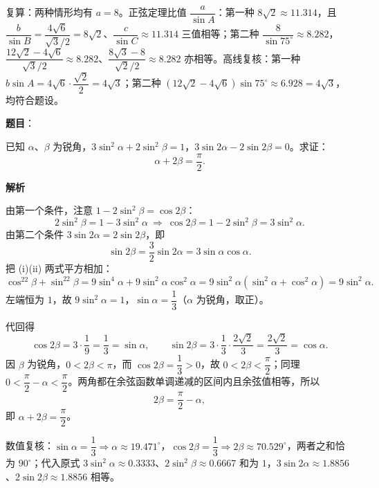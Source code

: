 \begin{answer}
复算：两种情形均有 $a=8$。正弦定理比值 $\dfrac{a}{\sin A}$：第一种 $8\sqrt2\approx11.314$，且 $\dfrac{b}{\sin B}=\dfrac{4\sqrt6}{\sqrt3/2}=8\sqrt2$、$\dfrac{c}{\sin C}\approx11.314$ 三值相等；第二种 $\dfrac{8}{\sin75^\circ}\approx8.282$，$\dfrac{12\sqrt2-4\sqrt6}{\sqrt3/2}\approx8.282$、$\dfrac{8\sqrt3-8}{\sqrt2/2}\approx8.282$ 亦相等。高线复核：第一种 $b\sin A=4\sqrt6\cdot\dfrac{\sqrt2}{2}=4\sqrt3$；第二种 $(12\sqrt2-4\sqrt6)\sin75^\circ\approx6.928=4\sqrt3$，均符合题设。


\end{answer}
\begin{answer}

\textbf{题目}：

已知 $\alpha$、$\beta$ 为锐角，$3\sin^2\alpha+2\sin^2\beta=1$，$3\sin 2\alpha-2\sin 2\beta=0$。求证：
\nopagebreak[4]
\[
\alpha+2\beta=\frac{\pi}{2}.
\]

\textbf{解析}

由第一个条件，注意 $1-2\sin^2\beta=\cos2\beta$：
\nopagebreak[4]
\[
2\sin^2\beta=1-3\sin^2\alpha\ \Longrightarrow\ \cos2\beta=1-2\sin^2\beta=3\sin^2\alpha. \tag{i}
\]
由第二个条件 $3\sin2\alpha=2\sin2\beta$，即
\nopagebreak[4]
\[
\sin2\beta=\frac32\sin2\alpha=3\sin\alpha\cos\alpha. \tag{ii}
\]
把 (i)(ii) 两式平方相加：
\nopagebreak[4]
\[
\cos^22\beta+\sin^22\beta=9\sin^4\alpha+9\sin^2\alpha\cos^2\alpha=9\sin^2\alpha(\sin^2\alpha+\cos^2\alpha)=9\sin^2\alpha.
\]
左端恒为 $1$，故 $9\sin^2\alpha=1$，$\sin\alpha=\dfrac13$（$\alpha$ 为锐角，取正）。

代回得
\nopagebreak[4]
\[
\cos2\beta=3\cdot\frac19=\frac13=\sin\alpha,\qquad
\sin2\beta=3\cdot\frac13\cdot\frac{2\sqrt2}{3}=\frac{2\sqrt2}{3}=\cos\alpha.
\]
因 $\beta$ 为锐角，$0<2\beta<\pi$，而 $\cos2\beta=\dfrac13>0$，故 $0<2\beta<\dfrac\pi2$；同理 $0<\dfrac\pi2-\alpha<\dfrac\pi2$。两角都在余弦函数单调递减的区间内且余弦值相等，所以
\nopagebreak[4]
\[
2\beta=\frac\pi2-\alpha,
\]
即 $\alpha+2\beta=\dfrac\pi2$。

数值复核：$\sin\alpha=\dfrac13\Rightarrow\alpha\approx19.471^\circ$，$\cos2\beta=\dfrac13\Rightarrow2\beta\approx70.529^\circ$，两者之和恰为 $90^\circ$；代入原式 $3\sin^2\alpha\approx0.3333$、$2\sin^2\beta\approx0.6667$ 和为 $1$，$3\sin2\alpha\approx1.8856$、$2\sin2\beta\approx1.8856$ 相等。


\end{answer}
